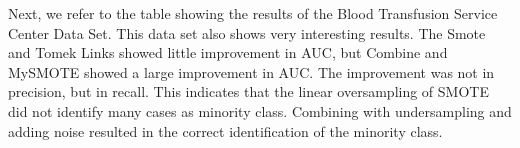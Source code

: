 Next, we refer to the table showing the results of the Blood Transfusion Service Center Data Set. This data set also shows very interesting results. The Smote and Tomek Links showed little improvement in AUC, but Combine and MySMOTE showed a large improvement in AUC. The improvement was not in precision, but in recall. This indicates that the linear oversampling of SMOTE did not identify many cases as minority class. Combining with undersampling and adding noise resulted in the correct identification of the minority class.

